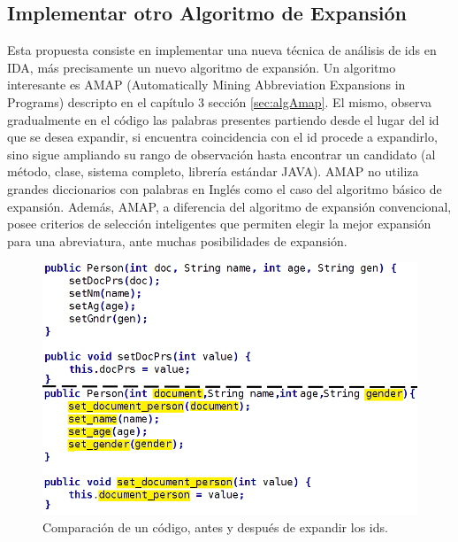  
\subsection{Implementar otro Algoritmo de Expansión}

Esta propuesta consiste en implementar una nueva técnica de análisis de ids en IDA, más precisamente un nuevo algoritmo de expansión. Un algoritmo interesante es AMAP (Automatically Mining Abbreviation Expansions in Programs) descripto en el capítulo 3 sección \ref{sec:algAmap}. El mismo, observa gradualmente en el código las palabras presentes partiendo desde el lugar del id que se desea expandir, si encuentra coincidencia con el id procede a expandirlo, sino sigue ampliando su rango de observación hasta encontrar un candidato (al método, clase, sistema completo, librería estándar JAVA). AMAP no utiliza grandes diccionarios con palabras en Inglés como el caso del algoritmo básico de expansión.
Además, AMAP, a diferencia del algoritmo de expansión convencional, posee criterios de selección inteligentes que permiten elegir la mejor expansión para una abreviatura, ante muchas posibilidades de expansión.

\begin{figure}[t] %
\centerline{%
\includegraphics[scale= 0.52]{./cap5/cod.png}
}
\caption{Comparación de un código, antes y después de expandir los ids.}
\label{cod}
\end{figure}

